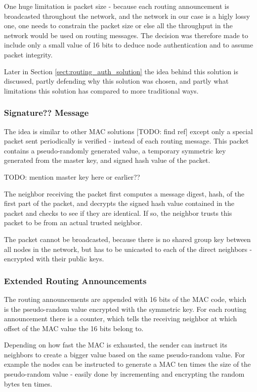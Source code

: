 One huge limitation is packet size - because each routing announcement is
broadcasted throughout the network, and the network in our case is a higly lossy
one, one needs to constrain the packet size or else all the throughput in the
network would be used on routing messages. The decision was therefore made to
include only a small value of 16 bits to deduce node authentication and to
assume packet integrity.

Later in Section \ref{sect:routing_auth_solution} the idea  behind this
solution is discussed, partly defending why this solution was chosen, and partly
what limitations this solution has compared to more traditional ways.

\subsubsection*{Signature?? Message}

The idea is similar to other \ac{MAC} solutions [TODO: find ref] except only a
special packet sent periodically is verified - instead of each routing message.
This packet contains a pseudo-randomly generated value, a temporary symmetric
key generated from the master key, and signed hash value of the packet.

TODO: mention master key here or earlier??

The neighbor receiving the packet first computes a message digest, hash, of the
first part of the packet, and decrypts the signed hash value contained in the
packet and checks to see if they are identical. If so, the neighbor trusts this
packet to be from an actual trusted neighbor.

The packet cannot be broadcasted, because there is no shared group key between
all nodes in the network, but has to be unicasted to each of the direct
neighbors - encrypted with their public keys.

\subsubsection*{Extended Routing Announcements}

The routing announcements are appended with 16 bits of the \ac{MAC} code, which
is the pseudo-random value encrypted with the symmetric key. For each routing
announcement there is a counter, which tells the receiving neighbor at which
offset of the \ac{MAC} value the 16 bits belong to.

Depending on how fast the \ac{MAC} is exhausted, the sender can instruct its
neighbors to create a bigger value based on the same pseudo-random value. For
example the nodes can be instructed to generate a \ac{MAC} ten times the size of
the pseudo-random value - easily done by incrementing and encrypting the random
bytes ten times.

